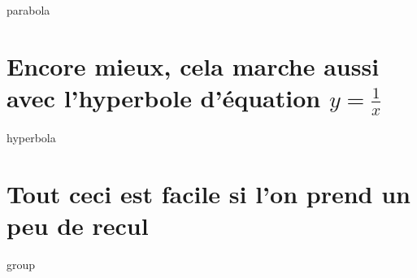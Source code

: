 \documentclass[12pt]{amsart}
\begin{document}
{parabola}




\section{\texorpdfstring{Encore mieux, cela marche aussi avec l'hyperbole d'équation $y = \frac{1}{x}$}%
                        {Encore mieux, cela marche aussi avec l'hyperbole d'équation y = 1 / x}}
\label{hyperbola}
                        
{hyperbola}




\section{Tout ceci est facile si l'on prend un peu de recul}
\label{group}

{group}
\end{document}
